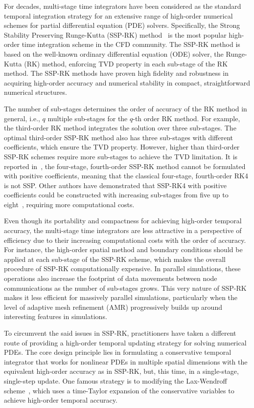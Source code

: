 For decades, multi-stage time integrators have been considered
as the standard temporal integration strategy for an extensive range of high-order numerical schemes
for partial differential equation (PDE) solvers.
Specifically, the Strong Stability Preserving Runge-Kutta (SSP-RK) method~\cite{gottlieb1998total,gottlieb2001strong,gottlieb2011strong}
is the most popular high-order time integration scheme in the CFD community.
The SSP-RK method is based on the well-known ordinary differential equation (ODE) solver,
the Runge-Kutta (RK) method, enforcing TVD property in each sub-stage of the RK method.
The SSP-RK methods have proven high fidelity and robustness
in acquiring high-order accuracy and numerical stability
in compact, straightforward numerical structures.

The number of sub-stages determines the order of accuracy of the RK method in general,
i.e., \( q \) multiple sub-stages for the \( q \)-th order RK method.
For example, the third-order RK method integrates the solution over three sub-stages.
The optimal third-order SSP-RK method also has three sub-stages with different coefficients,
which ensure the TVD property.
However, higher than third-order SSP-RK schemes require more sub-stages to achieve the TVD limitation.
It is reported in~\cite{gottlieb1998total}, the four-stage, fourth-order SSP-RK method
cannot be formulated with positive coefficients,
meaning that the classical four-stage, fourth-order RK4 is not SSP\@.
Other authors have demonstrated that SSP-RK4 with positive coefficients
could be constructed with increasing sub-stages from five up to eight~\cite{spiteri2002new,spiteri2003non},
requiring more computational costs.

Even though its portability and compactness for achieving high-order temporal accuracy,
the multi-stage time integrators are less attractive in a perspective of efficiency
due to their increasing computational costs with the order of accuracy.
For instance, the high-order spatial method and boundary conditions
should be applied at each sub-stage of the SSP-RK scheme,
which makes the overall procedure of SSP-RK computationally expensive.
In parallel simulations, these operations also increase the footprint of data movements
between node communications as the number of sub-stages grows.
This very nature of SSP-RK makes it less efficient for massively parallel simulations,
particularly when the level of adaptive mesh refinement (AMR)
progressively builds up around interesting features in simulations.

To circumvent the said issues in SSP-RK, practitioners have taken a different route
of providing a high-order temporal updating strategy for solving numerical PDEs.
The core design principle lies in formulating a conservative temporal integrator
that works for nonlinear PDEs in multiple spatial dimensions
with the equivalent high-order accuracy as in SSP-RK, but, this time, in a single-stage, single-step update.
One famous strategy is to modifying the Lax-Wendroff scheme~\cite{lax1959systems},
which uses a time-Taylor expansion of the conservative variables to achieve high-order temporal accuracy.

